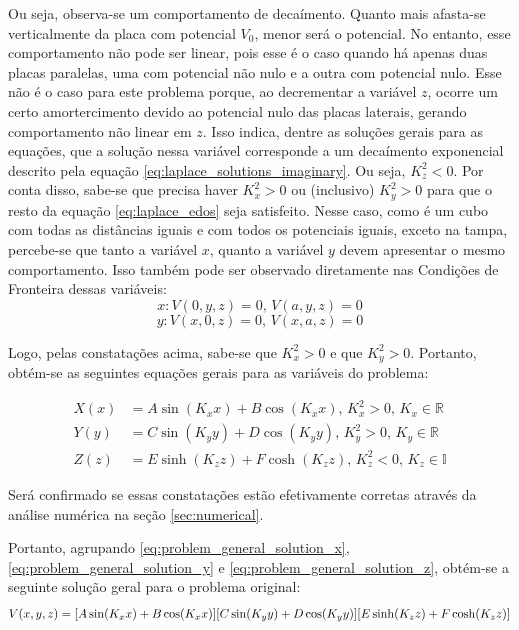 \documentclass{report}
\begin{document}
Ou seja, observa-se um comportamento de decaímento. Quanto mais afasta-se verticalmente da placa com potencial $ V_0 $,
menor será o potencial. No entanto, esse comportamento não pode ser linear, pois esse é o caso quando há apenas duas placas
paralelas, uma com potencial não nulo e a outra com potencial nulo. Esse não é o caso para este problema porque, ao decrementar
a variável $ z $, ocorre um certo amortercimento devido ao potencial nulo das placas laterais, gerando comportamento não linear
em $ z $. Isso indica, dentre as soluções gerais para as equações, que a solução nessa variável corresponde
a um decaímento exponencial descrito pela equação \ref{eq:laplace_solutions_imaginary}. Ou seja, $ K_z^2 < 0 $. Por conta
disso, sabe-se que precisa haver $ K_x^2 > 0 $ ou (inclusivo) $ K_y^2 > 0 $ para que o resto da equação \ref{eq:laplace_edos} seja satisfeito.
Nesse caso, como é um cubo com todas as distâncias iguais e com todos os potenciais iguais, exceto na tampa, percebe-se que tanto
a variável $ x $, quanto a variável $ y $ devem apresentar o mesmo comportamento. Isso também pode ser observado diretamente nas
Condições de Fronteira dessas variáveis:
$$ x: V(0, y, z) = 0,\, V(a, y, z) = 0 $$
$$ y: V(x, 0, z) = 0,\, V(x, a, z) = 0 $$

Logo, pelas constatações acima, sabe-se que $ K_x^2 > 0 $ e que $ K_y^2 > 0 $. Portanto, obtém-se as seguintes equações gerais para as
variáveis do problema:

\vspace*{-1.5\baselineskip}
\begin{center}
  \begin{align}
    \label{eq:problem_general_solution_x}
    X(x) &= A\sin(K_xx) + B\cos(K_xx),\, K_x^2 > 0,\, K_x \in \mathbb{R} \\
    \label{eq:problem_general_solution_y}
    Y(y) &= C\sin(K_yy) + D\cos(K_yy),\, K_y^2 > 0,\, K_y \in \mathbb{R} \\
    \label{eq:problem_general_solution_z}
    Z(z) &= E\sinh(K_zz) + F\cosh(K_zz),\, K_z^2 < 0,\, K_z \in \mathbb{I}
  \end{align}
\end{center}

Será confirmado se essas constatações estão efetivamente corretas através da
análise numérica na seção \ref{sec:numerical}.

Portanto, agrupando \ref{eq:problem_general_solution_x}, \ref{eq:problem_general_solution_y} e
\ref{eq:problem_general_solution_z}, obtém-se a seguinte solução geral para o problema original:
\begin{equation}
    \label{eq:problem_general_solution}
    \centering
    V(x, y, z) = [A\sin(K_xx) + B\cos(K_xx)][C\sin(K_yy) + D\cos(K_yy)][E\sinh(K_zz) + F\cosh(K_zz)]
\end{equation}
\end{document}

